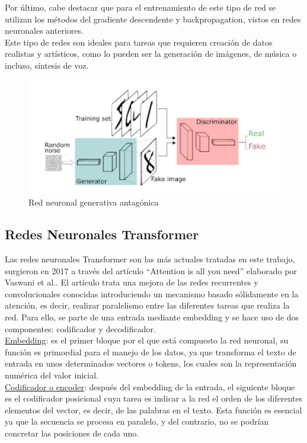 Por último, cabe destacar que para el entrenamiento de este tipo de red se utilizan los métodos del gradiente descendente y backpropagation, vistos en redes neuronales anteriores. \\

Este tipo de redes son ideales para tareas que requieren creación de datos realistas y artísticos, como lo pueden ser la generación de imágenes, de música o incluso, síntesis de voz. 

\begin{figure}[h]
	\centering
	\includegraphics[width = 1 \textwidth]{Imagenes/Vectorial/gan.png}
	\caption{Red neuronal generativa antagónica}
	\label{fig:gan}
\end{figure}


\subsection{Redes Neuronales Transformer}

Las redes neuronales Transformer son las más actuales tratadas en este trabajo, surgieron en 2017 a través del artículo “Attention is all you need” elaborado por Vaswani et al.. El artículo trata una mejora de las redes recurrentes y convolucionales conocidas introduciendo un mecanismo basado sólidamente en la atención, es decir, realizar paralelismo entre las diferentes tareas que realiza la red. Para ello, se parte de una entrada mediante embedding y se hace uso de dos componentes: codificador y decodificador. \\

\underline{Embedding}: es el primer bloque por el que está compuesto la red neuronal, su función es primordial para el manejo de los datos, ya que transforma el texto de entrada en unos determinados vectores o tokens, los cuales son la representación numérica del valor inicial. \\

\underline{Codificador o encoder}:  después del embedding de la entrada, el siguiente bloque es el codificador posicional cuya tarea es indicar a la red el orden de los diferentes elementos del vector, es decir, de las palabras en el texto. Esta función es esencial ya que la secuencia se procesa en paralelo, y del contrario, no se podrían concretar las posiciones de cada uno.\\

